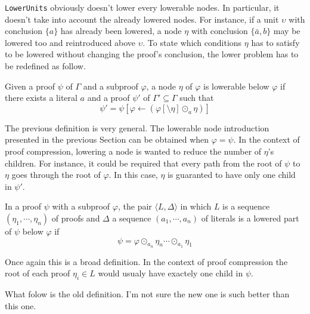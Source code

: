 \documentclass{llncs}
\newcommand{\dual}[1]{{\ensuremath{\bar{#1}}}}
\newenvironment{jogo}{\color{teal}}{}
\newcommand{\LowerUnits}{\texttt{LowerUnits}}
\begin{document}
{\LowerUnits} obviously doesn't lower every lowerable nodes. In particular, it doesn't take into
account the already lowered nodes. For instance, if a unit $\upsilon$ with conclusion $\{a\}$ has already been
lowered, a node $\eta$ with conclusion $\{\dual{a},b\}$ may be lowered too and reintroduced above
$\upsilon$. To state which conditions $\eta$ has to satisfy to be lowered without changing the
proof's conclusion, the lower problem has to be redefined as follow.

\begin{definition}
Given a proof $\psi$ of $\Gamma$ and a subproof $\varphi$, a node $\eta$ of $\varphi$ is lowerable
below $\varphi$ if there exists a literal $a$ and a proof $\psi'$ of $\Gamma' \subseteq
\Gamma$ such that
\begin{equation}
  \psi' = \psi[\varphi \leftarrow (\varphi[\setminus \eta] \odot_a \eta)]
\end{equation}
\end{definition}
The previous definition is very general. The lowerable node introduction presented in the previous
Section can be obtained when $\varphi = \psi$. In the context of proof compression, lowering a node
is wanted to reduce the number of $\eta$'s children. For instance, it could be required that every
path from the root of $\psi$ to $\eta$ goes through the root of $\varphi$. In this case, $\eta$ is
guaranted to have only one child in $\psi'$.

\begin{definition}
In a proof $\psi$ with a subproof $\varphi$, the pair $\langle L,\Delta \rangle$ in which $L$ is a
sequence $(\eta_1,\cdots,\eta_n)$ of proofs and $\Delta$ a sequence $(a_1,\cdots,a_n)$ of literals
is a lowered part of $\psi$ below $\varphi$ if
\begin{equation}
  \psi = \varphi \odot_{a_n} \eta_n \cdots \odot_{a_1} \eta_1
\end{equation}
\end{definition}
Once again this is a broad definition. In the context of proof compression the root of each proof
$\eta_i \in L$ would usualy have exactely one child in $\psi$.



\begin{jogo}
What folow is the old definition. I'm not sure the new one is such better than this one.
\end{jogo}
\end{document}
